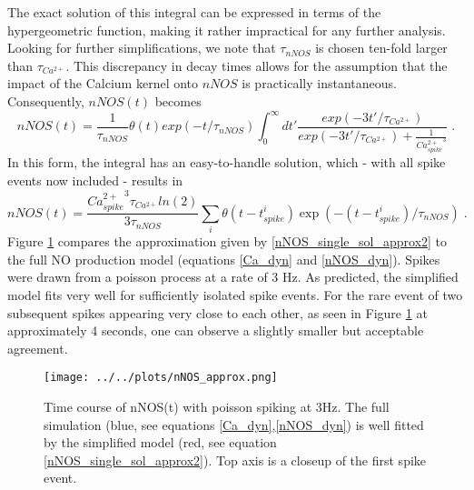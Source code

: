 \documentclass[10pt,a4paper]{article}
\begin{document}
The exact solution of this integral can be expressed in terms of the hypergeometric function, making it rather impractical for any further analysis. Looking for further simplifications, we note that $\tau_{nNOS}$ is chosen ten-fold larger than $\tau_{Ca^{2+}}$. This discrepancy in decay times allows for the assumption that the impact of the Calcium kernel onto $nNOS$ is practically instantaneous. Consequently, $nNOS(t)$ becomes
\begin{equation}
nNOS(t) = \frac{1}{\tau_{nNOS}} \theta(t) exp(-t/\tau_{nNOS}) \int_{0}^\infty dt' \frac{exp(-3t'/\tau_{Ca^{2+}})}{exp(-3t'/\tau_{Ca^{2+}}) + \frac{1}{{Ca^{2+}_{spike}}^3}}\;.
\label{nNOS_single_sol_approx1}
\end{equation}
In this form, the integral has an easy-to-handle solution, which - with all spike events now included - results in
\begin{equation}
nNOS(t) = \frac{{Ca^{2+}_{spike}}^3 \tau_{Ca^{2+}}ln(2)}{3\tau_{nNOS}} \sum_i \theta(t-t^i_{spike}) \exp(-(t-t^i_{spike})/\tau_{nNOS})\;.
\label{nNOS_single_sol_approx2}
\end{equation}
Figure \ref{nNOS_approx_plot} compares the approximation given by \eqref{nNOS_single_sol_approx2} to the full NO production model (equations \eqref{Ca_dyn} and \eqref{nNOS_dyn}). Spikes were drawn from a poisson process at a rate of 3 Hz. As predicted, the simplified model fits very well for sufficiently isolated spike events. For the rare event of two subsequent spikes appearing very close to each other, as seen in Figure \ref{nNOS_approx_plot} at approximately 4 seconds, one can observe a slightly smaller but acceptable agreement.
\begin{figure}
\texttt{[image: ../../plots/nNOS\_approx.png]}
\caption{Time course of nNOS(t) with poisson spiking at 3Hz. The full simulation (blue, see equations \eqref{Ca_dyn},\eqref{nNOS_dyn}) is well fitted by the simplified model (red, see equation \eqref{nNOS_single_sol_approx2}). Top axis is a closeup of the first spike event.}
\label{nNOS_approx_plot}
\end{figure}
\end{document}
